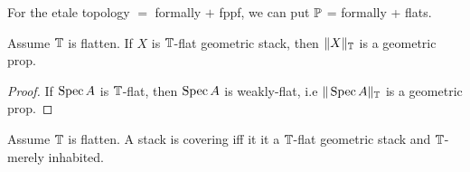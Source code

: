 \begin{example}
	For the etale topology $=$ formally \etale $+$ fppf, we can put $\mathbb{P}$ = formally \etale + flats. %
\end{example}

\begin{lemma}{\label{lemma:TruncOfP}}
	Assume $\mathbb{T}$ is flatten.
	If $X$ is $\mathbb{T}$-flat geometric stack, then $\|X\|_{\mathbb{T}}$ is a geometric prop.
\end{lemma}
\begin{proof}
	
	If $\operatorname{Spec} A$ is $\mathbb{T}$-flat, then $\operatorname{Spec} A$ is weakly-flat, i.e $\| \operatorname{Spec} A\|_{\mathbb{T}}$ is a geometric prop.
\end{proof}
\begin{lemma}{\label{lemma:detectCovering}}
	Assume $\mathbb{T}$ is flatten.
	A stack is covering iff it it a $\mathbb{T}$-flat geometric stack and $\mathbb{T}$-merely inhabited.
\end{lemma}

